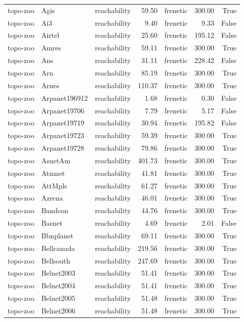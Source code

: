 \begin{tabular}{lllrlrr}
topo-zoo & Agis & reachability & 59.50 & frenetic & 300.00 & True \\
topo-zoo & Ai3 & reachability & 9.40 & frenetic & 9.33 & False \\
topo-zoo & Airtel & reachability & 25.60 & frenetic & 195.12 & False \\
topo-zoo & Amres & reachability & 59.11 & frenetic & 300.00 & True \\
topo-zoo & Ans & reachability & 31.11 & frenetic & 228.42 & False \\
topo-zoo & Arn & reachability & 85.19 & frenetic & 300.00 & True \\
topo-zoo & Arnes & reachability & 110.37 & frenetic & 300.00 & True \\
topo-zoo & Arpanet196912 & reachability & 1.68 & frenetic & 0.30 & False \\
topo-zoo & Arpanet19706 & reachability & 7.79 & frenetic & 5.17 & False \\
topo-zoo & Arpanet19719 & reachability & 30.94 & frenetic & 195.82 & False \\
topo-zoo & Arpanet19723 & reachability & 59.39 & frenetic & 300.00 & True \\
topo-zoo & Arpanet19728 & reachability & 79.86 & frenetic & 300.00 & True \\
topo-zoo & AsnetAm & reachability & 401.73 & frenetic & 300.00 & True \\
topo-zoo & Atmnet & reachability & 41.81 & frenetic & 300.00 & True \\
topo-zoo & AttMpls & reachability & 61.27 & frenetic & 300.00 & True \\
topo-zoo & Azrena & reachability & 46.01 & frenetic & 300.00 & True \\
topo-zoo & Bandcon & reachability & 44.76 & frenetic & 300.00 & True \\
topo-zoo & Basnet & reachability & 4.69 & frenetic & 2.01 & False \\
topo-zoo & Bbnplanet & reachability & 69.11 & frenetic & 300.00 & True \\
topo-zoo & Bellcanada & reachability & 219.56 & frenetic & 300.00 & True \\
topo-zoo & Bellsouth & reachability & 247.69 & frenetic & 300.00 & True \\
topo-zoo & Belnet2003 & reachability & 51.41 & frenetic & 300.00 & True \\
topo-zoo & Belnet2004 & reachability & 51.41 & frenetic & 300.00 & True \\
topo-zoo & Belnet2005 & reachability & 51.48 & frenetic & 300.00 & True \\
topo-zoo & Belnet2006 & reachability & 51.48 & frenetic & 300.00 & True \\
\bottomrule
\end{tabular}
